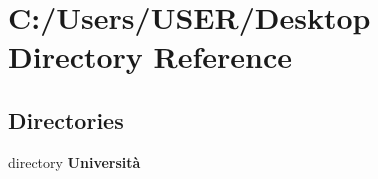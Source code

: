 \section{C\+:/\+Users/\+U\+S\+E\+R/\+Desktop Directory Reference}
\label{dir_fb360731e9c44d69b7161340d6e6954f}
\subsection*{Directories}
\begin{DoxyCompactItemize}
\item 
directory \textbf{ Università}
\end{DoxyCompactItemize}

